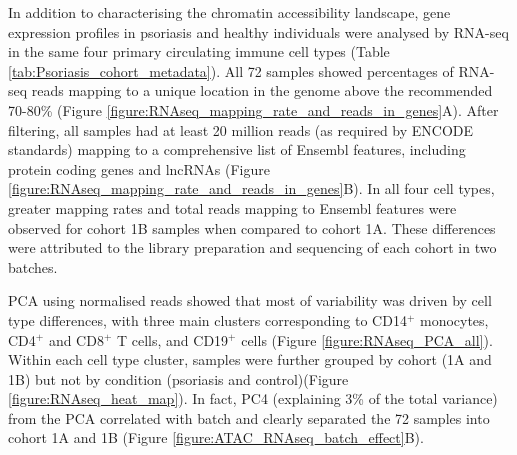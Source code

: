 In addition to characterising the chromatin accessibility landscape, gene expression profiles in psoriasis and healthy individuals were analysed  by RNA-seq in the same four primary circulating immune cell types (Table \ref{tab:Psoriasis_cohort_metadata}). All 72 samples showed percentages of RNA-seq reads mapping to a unique location in the genome above the recommended 70-80\% (Figure \ref{figure:RNAseq_mapping_rate_and_reads_in_genes}A). After filtering, all samples had at least 20 million reads (as required by ENCODE standards) mapping to a comprehensive list of Ensembl features, including protein coding genes and lncRNAs (Figure \ref{figure:RNAseq_mapping_rate_and_reads_in_genes}B). %
In all four cell types, greater mapping rates and total reads mapping to Ensembl features were observed for cohort 1B samples when compared to cohort 1A. These differences were attributed to the library preparation and sequencing of each cohort in two batches.  

PCA using normalised reads showed that most of variability was driven by cell type differences, with three main clusters corresponding to CD14$^+$ monocytes, CD4$^+$ and CD8$^+$ T cells, and CD19$^+$ cells (Figure \ref{figure:RNAseq_PCA_all}). Within each cell type cluster, samples were further grouped by cohort (1A and 1B) but not by condition (psoriasis and control)(Figure \ref{figure:RNAseq_heat_map}). In fact, PC4 (explaining 3\% of the total variance) from the PCA correlated with batch and clearly separated the 72 samples into cohort 1A and 1B (Figure \ref{figure:ATAC_RNAseq_batch_effect}B). 



